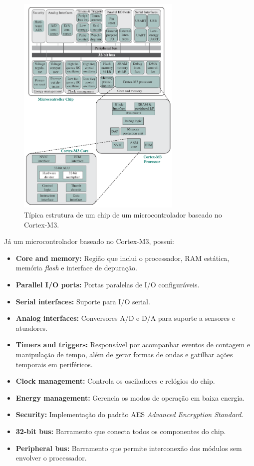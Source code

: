 \documentclass{article}
\begin{document}
\begin{figure}[H]
    \centering
    \includegraphics[width=0.7\textwidth]{cortex.png}
    \caption{Típica estrutura de um chip de um microcontrolador baseado no
    Cortex-M3.}
\end{figure}

Já um microcontrolador baseado no Cortex-M3, possui:

\begin{itemize}
    \item \textbf{Core and memory:} Região que inclui o processador, RAM
        estática, memória \textit{flash} e interface de depuração.
    \item \textbf{Parallel I/O ports:} Portas paralelas de I/O configuráveis.
    \item \textbf{Serial interfaces:} Suporte para I/O serial.
    \item \textbf{Analog interfaces:} Conversores A/D e D/A para suporte a
        sensores e atuadores.
    \item \textbf{Timers and triggers:} Responsável por acompanhar eventos de
        contagem e manipulação de tempo, além de gerar formas de ondas e
        gatilhar ações temporais em periféricos.
    \item \textbf{Clock management:} Controla os osciladores e relógios do chip.
    \item \textbf{Energy management:} Gerencia os modos de operação em baixa
        energia.
    \item \textbf{Security:} Implementação do padrão AES \textit{Advanced
        Encryption Standard}.
    \item \textbf{32-bit bus:} Barramento que conecta todos os componentes do
        chip.
    \item \textbf{Peripheral bus:} Barramento que permite interconexão dos
        módulos sem envolver o processador.
\end{itemize}
\end{document}
